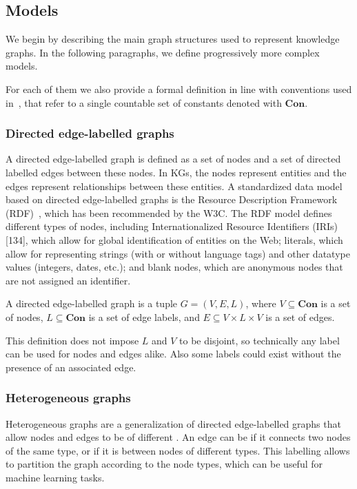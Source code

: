 \subsection{Models}
We begin by describing the main graph structures used to represent knowledge graphs. In the following paragraphs, we define progressively more complex models. 

\medskip
For each of them we also provide a formal definition in line with conventions used in~\cite{Angles2017FoundationmodernQueryLnguagesforGraphDatabases}, that refer to a single countable set of constants denoted with $\textbf{Con}$.

\subsubsection{Directed edge-labelled graphs}
A directed edge-labelled graph is defined as a set of nodes and a set of directed labelled edges between these nodes. In KGs, the nodes represent entities and the edges represent relationships between these entities. A standardized data model based on directed edge-labelled graphs is the Resource Description Framework (RDF)~\cite{Cyganiak2014rdf}, which has been recommended by the W3C. The RDF model defines different types of nodes, including Internationalized Resource Identifiers (IRIs) [134], which allow for global identification of entities on the Web; literals, which allow for representing strings (with or without language tags) and other datatype values (integers, dates, etc.); and blank nodes, which are anonymous nodes that are not assigned an identifier.

\begin{definition}\label{def:directed-edge-labelled-graph}
A directed edge-labelled graph is a tuple $G = (V, E, L)$, where $V \subseteq \textbf{Con}$ is a set of nodes, $L \subseteq \textbf{Con}$ is a set of edge labels, and $E \subseteq V \times L \times V$ is a set of edges.
\end{definition}
This definition does not impose $L$ and $V$ to be disjoint, so technically any label can be used for nodes and edges alike. Also some labels could exist without the presence of an associated edge.

\subsubsection{Heterogeneous graphs}
Heterogeneous graphs are a generalization of directed edge-labelled graphs that allow nodes and edges to be of different . An edge can be  if it connects two nodes of the same type, or  if it is between nodes of different types. This labelling allows to partition the graph according to the node types, which can be useful for machine learning tasks.

